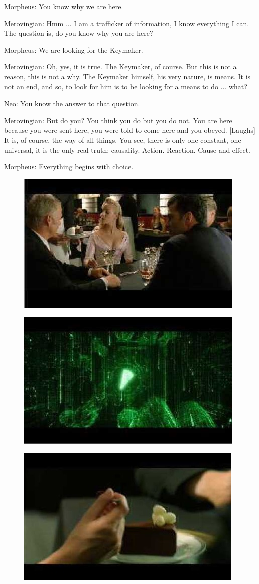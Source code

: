 \documentclass[UTF8]{ctexart}
\newenvironment{myquote}{\color{green} \setlength{\leftskip}{6em} \setlength{\rightskip}{4em} \setlength{\parindent}{-2em}}{\par}
\begin{document}
\begin{myquote}
Morpheus: You know why we are here.

Merovingian: Hmm ... I am a trafficker of information, I know everything I can. The question is, do you know why you are here?

Morpheus: We are looking for the Keymaker.

Merovingian: Oh, yes, it is true. The Keymaker, of course. But this is not a reason, this is not a why. The Keymaker himself, his very nature, is means. It is not an end, and so, to look for him is to be looking for a means to do ... what?

Neo: You know the answer to that question.

Merovingian: But do you? You think you do but you do not. You are here because you were sent here, you were told to come here and you obeyed. [Laughs] It is, of course, the way of all things. You see, there is only one constant, one universal, it is the only real truth: causality. Action. Reaction. Cause and effect.

Morpheus: Everything begins with choice.

\begin{figure}[htb]
\centering
\includegraphics[width=0.5\linewidth]{fig/read_reloaded-96}
\end{figure}

\begin{figure}[htb]
\centering
\includegraphics[width=0.5\linewidth]{fig/read_reloaded-96-1}
\end{figure}

\begin{figure}[htb]
\centering
\includegraphics[width=0.5\linewidth]{fig/read_reloaded-96-2}
\end{figure}


\end{myquote}
\end{document}
